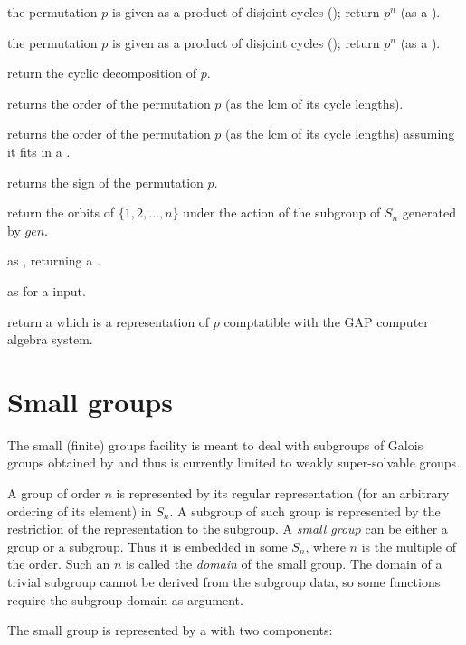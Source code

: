  the permutation $p$ is given as
a product of disjoint cycles (); return $p^n$ (as a ).

 the permutation $p$ is given as
a product of disjoint cycles (); return $p^n$ (as a ).

 return the cyclic decomposition of $p$.

 returns the order of the permutation $p$
(as the lcm of its cycle lengths).

 returns the order of the permutation $p$
(as the lcm of its cycle lengths) assuming it fits in a .

 returns the sign of the permutation $p$.

 return the orbits of
$\{1,2,\ldots,n\}$ under the action of the subgroup of $S_n$ generated by
$gen$.

 as , returning a
.

 as  for a  input.

 return a  which is a representation
of $p$ comptatible with the GAP computer algebra system.

\section{Small groups}

The small (finite) groups facility is meant to deal with subgroups of Galois
groups obtained by  and thus is currently limited to weakly
super-solvable groups.

A group  of order $n$ is represented by its regular representation
(for an arbitrary ordering of its element) in $S_n$.  A subgroup of such group
is represented by the restriction of the representation to the subgroup.
A \emph{small group} can be either a group or a subgroup. Thus it is embedded
in some $S_n$, where $n$ is the multiple of the order. Such an $n$ is called
the \emph{domain} of the small group. The domain of a trivial subgroup cannot
be derived from the subgroup data, so some functions require the subgroup
domain as argument.

The small group  is represented by a  with two
components:

